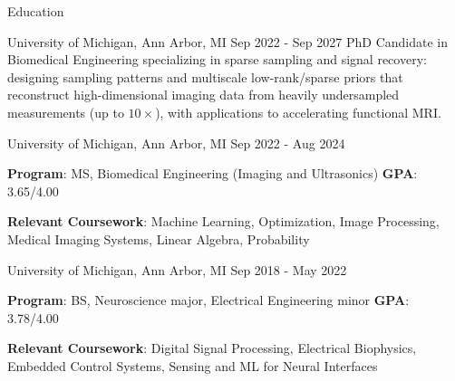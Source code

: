 \documentclass{resume}
\begin{document}
\begin{rSection}{Education}
\begin{rSubsection}{University of Michigan}{, Ann Arbor, MI \hfill {Sep 2022 - Sep 2027}}
	PhD Candidate in Biomedical Engineering specializing in sparse sampling and signal recovery: designing sampling patterns and multiscale low-rank/sparse priors that reconstruct high-dimensional imaging data from heavily undersampled measurements (up to $10\times$), with applications to accelerating functional MRI.
\end{rSubsection}
\begin{rSubsection}{University of Michigan}{, Ann Arbor, MI \hfill {Sep 2022 - Aug 2024}}
	\item \textbf{Program}: MS, Biomedical Engineering (Imaging and Ultrasonics) \hfill{\textbf{GPA}: 3.65/4.00}
    \item{\textbf{Relevant Coursework}: Machine Learning, Optimization, Image Processing, Medical Imaging Systems, Linear Algebra, Probability}
\end{rSubsection}
\begin{rSubsection}{University of Michigan}{, Ann Arbor, MI \hfill {Sep 2018 - May 2022}}
	\item{\textbf{Program}: BS, Neuroscience major, Electrical Engineering minor} \hfill{\textbf{GPA}: 3.78/4.00}
    \item{\textbf{Relevant Coursework}: Digital Signal Processing, Electrical Biophysics, Embedded Control Systems, Sensing and ML for Neural Interfaces}
\end{rSubsection}
\end{rSection}
\end{document}
